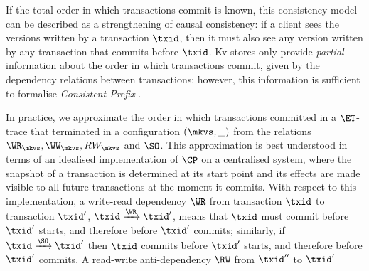 \label{para:cp}
If the total order in which transactions commit is known, this consistency model 
can be described as a strengthening of causal consistency: 
if a client sees the versions written by a transaction $\txid$,
then it must also see any version written by any transaction that commits before $\txid$. 
Kv-stores only provide {\em partial} information about the order in which transactions commit, 
given by the dependency relations between transactions; however, 
this information is sufficient to formalise \emph{Consistent Prefix} \cite{laws}.

In practice, we approximate the order in which transactions 
committed in a $\ET$-trace that terminated in a configuration $(\mkvs, \_)$ from the relations $\WR_{\mkvs}, \WW_{\mkvs}, 
RW_{\mkvs}$ and $\SO$. This approximation is best understood in terms of an idealised implementation of 
$\CP$ on a centralised system,
where the snapshot of a transaction is determined at its start point and its effects are made visible 
to all future transactions at the moment it commits. 
With respect to this implementation, a write-read dependency \(\WR\) from transaction $\txid$ to transaction $\txid'$, 
$\txid \xrightarrow{\WR} \txid'$, means that 
$\txid$ {must} commit before $\txid'$ starts, and therefore before $\txid'$ commits; 
similarly, if $\txid \xrightarrow{\SO} \txid'$ then $\txid$ commits before $\txid'$ starts, 
and therefore before $\txid'$ commits.
% 
A read-write anti-dependency \(\RW\) from $\txid''$ to $\txid'$ 
